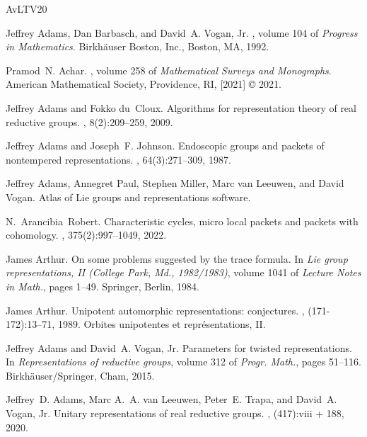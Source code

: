 \documentclass[a4paper, 11pt]{article}
\newcommand{\etalchar}[1]{$^{#1}$}
\begin{document}
\begin{thebibliography}{AvLTV20}

Jeffrey Adams, Dan Barbasch, and David~A. Vogan, Jr.
, volume 104 of {\em Progress in Mathematics}.
\newblock Birkh\"auser Boston, Inc., Boston, MA, 1992.

Pramod~N. Achar.
,
  volume 258 of {\em Mathematical Surveys and Monographs}.
\newblock American Mathematical Society, Providence, RI, [2021] \copyright
  2021.

Jeffrey Adams and Fokko du~Cloux.
\newblock Algorithms for representation theory of real reductive groups.
, 8(2):209--259, 2009.

Jeffrey Adams and Joseph~F. Johnson.
\newblock Endoscopic groups and packets of nontempered representations.
, 64(3):271--309, 1987.

\bibitem[APM{\etalchar{+}}]{atlas}
Jeffrey Adams, Annegret Paul, Stephen Miller, Marc van Leeuwen, and David
  Vogan.
\newblock Atlas of {L}ie groups and representations software.

N.~Arancibia~Robert.
\newblock Characteristic cycles, micro local packets and packets with
  cohomology.
, 375(2):997--1049, 2022.

James Arthur.
\newblock On some problems suggested by the trace formula.
\newblock In {\em Lie group representations, {II} ({C}ollege {P}ark, {M}d.,
  1982/1983)}, volume 1041 of {\em Lecture Notes in Math.}, pages 1--49.
  Springer, Berlin, 1984.

James Arthur.
\newblock Unipotent automorphic representations: conjectures.
, (171-172):13--71, 1989.
\newblock Orbites unipotentes et repr{\'e}sentations, II.

Jeffrey Adams and David~A. Vogan, Jr.
\newblock Parameters for twisted representations.
\newblock In {\em Representations of reductive groups}, volume 312 of {\em
  Progr. Math.}, pages 51--116. Birkh\"{a}user/Springer, Cham, 2015.

Jeffrey~D. Adams, Marc A.~A. van Leeuwen, Peter~E. Trapa, and David~A. Vogan,
  Jr.
\newblock Unitary representations of real reductive groups.
, (417):viii + 188, 2020.


\end{thebibliography}
\end{document}
